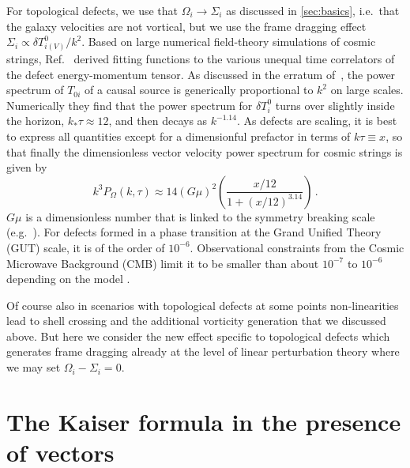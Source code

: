 \documentclass[a4paper,twocolumn,aps,prd,nolongbibliography,superscriptaddress,showpacs,showkeys,amsmath,amssymb,floatfix,nofootinbib]{revtex4-1}
\renewcommand{\[}{\begin{equation}}
\renewcommand{\]}{\end{equation}}
\begin{document}
For topological defects, we use that $\Omega_i \rightarrow \Sigma_i$ as discussed in \ref{sec:basics}, i.e.\ that the galaxy velocities are not vortical, but we use the frame dragging effect  $\Sigma_i \propto \delta T_{i(V)}^0 / k^2$. Based on large numerical field-theory simulations of cosmic strings, Ref.~\cite{Daverio:2015nva} derived fitting functions to the various unequal time correlators of the defect energy-momentum tensor. As discussed in the erratum of~\cite{Daverio:2015nva}, the power spectrum of $T_{0i}$ of a causal source is generically proportional to $k^2$ on large scales. Numerically they find that the power spectrum for $\delta T^0_i$ turns over slightly inside the horizon, $k_* \tau \approx 12$, and then decays as $k^{-1.14}$.  As defects are scaling, it is best to express all quantities except for a dimensionful prefactor in terms of $k \tau \equiv x$, so that finally the dimensionless vector velocity power spectrum for cosmic strings is given by
\[
k^3 P_\Omega (k,\tau) \approx 14 (G\mu)^2 \left( \frac{x/12}{1 +(x/12)^{3.14}} \right) \, . \label{POmdef}
\]
$G\mu$ is a dimensionless number that is linked to the symmetry breaking scale (e.g.\ \cite{Urrestilla:2007sf}). For defects formed in a phase transition at the Grand Unified Theory (GUT) scale, it is of the order of $10^{-6}$. Observational constraints from the Cosmic Microwave Background (CMB) limit it to be smaller than about $10^{-7}$ to $10^{-6}$ depending on the model \cite{Ade:2015xua,Lizarraga:2016onn}.

Of course also in scenarios with topological defects at some points non-linearities lead to shell crossing and the additional vorticity generation that we discussed above. But here we consider the new effect specific to topological defects which generates frame dragging already at the level of linear perturbation theory where we may set $\Omega_i-\Sigma_i=0$.


\section{The Kaiser formula in the presence of vectors\label{sec:rsd}}
\end{document}
